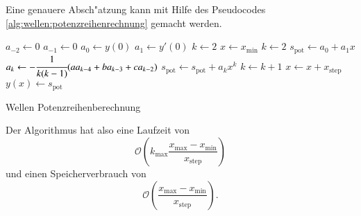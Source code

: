 Eine genauere Absch"atzung kann mit Hilfe des Pseudocodes 
\ref{alg:wellen:potenzreihenrechnung} gemacht werden.

\begin{algorithm}
	\begin{algorithmic}[1]
		\State $a_{-2} \gets 0$
		\State $a_{-1} \gets 0$
		\State $a_0 \gets y(0)$
		\State $a_1 \gets y'(0)$
		\State $k \gets 2$
		\State $x \gets x_{\text{min}}$
			\State $k \gets 2$
			\State $s_{\text{pot}} \gets a_0 + a_1x$
				\State $a_k \gets -\cfrac{1}{k(k-1)}			
				(aa_{k-4}+ba_{k-3}+ca_{k-2})$
				\State $s_{\text{pot}} \gets s_{\text{pot}} + a_k x^k$
				\State $k \gets k + 1$
			\EndFor
			\State $x \gets x + x_{\text{step}}$
			\State $y(x) \gets s_{\text{pot}}$
		\EndFor
	\end{algorithmic}
	\caption{Wellen Potenzreihenberechnung} 
	\label{alg:wellen:potenzreihenrechnung}
\end{algorithm}

Der Algorithmus hat also eine Laufzeit von
\begin{equation*}
	\mathcal{O}
	\left(
		k_{\text{max}}\frac{x_{\text{max}}-x_{\text{min}}}{x_{\text{step}}}
	\right)
\end{equation*}
und einen Speicherverbrauch von
\begin{equation*}
	\mathcal{O}
	\left(
		\frac{x_{\text{max}}-x_{\text{min}}}{x_{\text{step}}}
	\right).
\end{equation*}